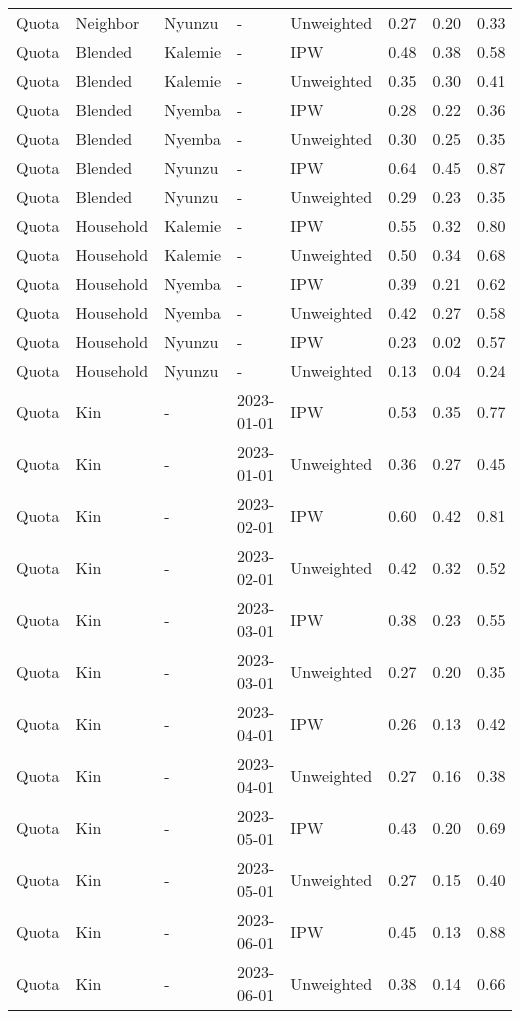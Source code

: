 \begin{longtable}[t]{lllllrrr}
Quota & Neighbor & Nyunzu & - & Unweighted & 0.27 & 0.20 & 0.33\\
Quota & Blended & Kalemie & - & IPW & 0.48 & 0.38 & 0.58\\
\addlinespace
Quota & Blended & Kalemie & - & Unweighted & 0.35 & 0.30 & 0.41\\
Quota & Blended & Nyemba & - & IPW & 0.28 & 0.22 & 0.36\\
Quota & Blended & Nyemba & - & Unweighted & 0.30 & 0.25 & 0.35\\
Quota & Blended & Nyunzu & - & IPW & 0.64 & 0.45 & 0.87\\
Quota & Blended & Nyunzu & - & Unweighted & 0.29 & 0.23 & 0.35\\
\addlinespace
Quota & Household & Kalemie & - & IPW & 0.55 & 0.32 & 0.80\\
Quota & Household & Kalemie & - & Unweighted & 0.50 & 0.34 & 0.68\\
Quota & Household & Nyemba & - & IPW & 0.39 & 0.21 & 0.62\\
Quota & Household & Nyemba & - & Unweighted & 0.42 & 0.27 & 0.58\\
Quota & Household & Nyunzu & - & IPW & 0.23 & 0.02 & 0.57\\
\addlinespace
Quota & Household & Nyunzu & - & Unweighted & 0.13 & 0.04 & 0.24\\
Quota & Kin & - & 2023-01-01 & IPW & 0.53 & 0.35 & 0.77\\
Quota & Kin & - & 2023-01-01 & Unweighted & 0.36 & 0.27 & 0.45\\
Quota & Kin & - & 2023-02-01 & IPW & 0.60 & 0.42 & 0.81\\
Quota & Kin & - & 2023-02-01 & Unweighted & 0.42 & 0.32 & 0.52\\
\addlinespace
Quota & Kin & - & 2023-03-01 & IPW & 0.38 & 0.23 & 0.55\\
Quota & Kin & - & 2023-03-01 & Unweighted & 0.27 & 0.20 & 0.35\\
Quota & Kin & - & 2023-04-01 & IPW & 0.26 & 0.13 & 0.42\\
Quota & Kin & - & 2023-04-01 & Unweighted & 0.27 & 0.16 & 0.38\\
Quota & Kin & - & 2023-05-01 & IPW & 0.43 & 0.20 & 0.69\\
\addlinespace
Quota & Kin & - & 2023-05-01 & Unweighted & 0.27 & 0.15 & 0.40\\
Quota & Kin & - & 2023-06-01 & IPW & 0.45 & 0.13 & 0.88\\
Quota & Kin & - & 2023-06-01 & Unweighted & 0.38 & 0.14 & 0.66\\

\end{longtable}
